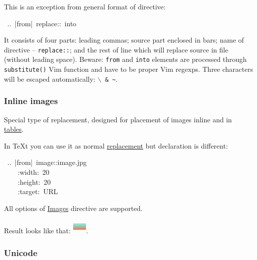 \documentclass[12pt]{article}
\begin{document}
This is an exception from general format of directive:

\begin{ttfamily}\begin{flushleft}
\mbox{~..~|from|~replace::~into}\\
\end{flushleft}\end{ttfamily}

It consists of four parts: leading commas; source part enclosed in
bars; name of directive -- \texttt{replace::}; and the rest of line which will
replace source in file (without leading space). Beware: \texttt{from} and \texttt{into}
elements are processed through \texttt{substitute()} Vim function and have to be
proper Vim regexps. Three characters will be escaped automatically: \texttt{$\backslash$ \& \~{}}.

\hypertarget{linline-images}{}
\subsubsection{Inline images}

Special type of replacement, designed for placement of images inline and
in \href{\#ltables}{tables}.

In \TeX{}t you can use it as normal \href{\#lreplacement}{replacement} but declaration is
different:

\begin{ttfamily}\begin{flushleft}
\mbox{~..~|from|~image::image.jpg}\\
\mbox{~~~~:width:~20~}\\
\mbox{~~~~:height:~20~}\\
\mbox{~~~~:target:~URL}\\
\end{flushleft}\end{ttfamily}

All options of \href{\#limages}{Images} directive are supported.

Result looks like that: \href{test.png}{\includegraphics[height=20pt, width=20pt]{test.png}}.

\hypertarget{lunicode}{}
\subsubsection{Unicode}
\end{document}
